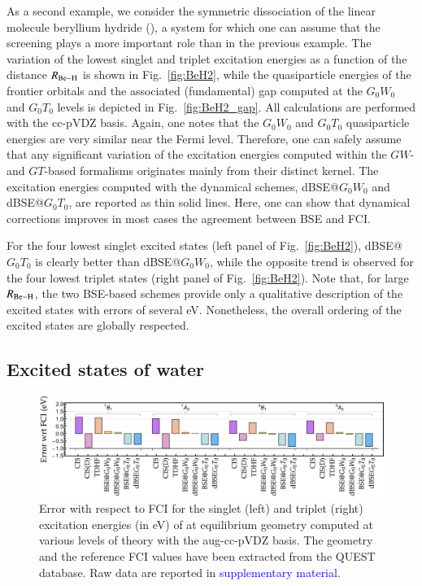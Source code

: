 \documentclass[aip,jcp,reprint,noshowkeys,superscriptaddress]{revtex4-1}
\newcommand{\SupMat}{\textcolor{blue}{supplementary material}}
\begin{document}
As a second example, we consider the symmetric dissociation of the linear molecule beryllium hydride (), a system for which one can assume that the screening plays a more important role than in the previous example.
The variation of the lowest singlet and triplet excitation energies as a function of the distance $R_{\ce{Be-H}}$ is shown in Fig.~\ref{fig:BeH2}, while the quasiparticle energies of the frontier orbitals and the associated (fundamental) gap computed at the $G_0W_0$ and $G_0T_0$ levels is depicted in Fig.~\ref{fig:BeH2_gap}.
All calculations are performed with the cc-pVDZ basis.
Again, one notes that the $G_0W_0$ and $G_0T_0$ quasiparticle energies are very similar near the Fermi level.
Therefore, one can safely assume that any significant variation of the excitation energies computed within the $GW$- and $GT$-based formalisms originates mainly from their distinct kernel.
The excitation energies computed with the dynamical schemes, dBSE@$G_0W_0$ and dBSE@$G_0T_0$, are reported as thin solid lines.
Here, one can show that dynamical corrections improves in most cases the agreement between BSE and FCI.

For the four lowest singlet excited states (left panel of Fig.~\ref{fig:BeH2}), dBSE@$G_0T_0$ is clearly better than dBSE@$G_0W_0$, while the opposite trend is observed for the four lowest triplet states (right panel of Fig.~\ref{fig:BeH2}).
Note that, for large $R_{\ce{Be-H}}$, the two BSE-based schemes provide only a qualitative description of the excited states with errors of several \si{\eV}.
Nonetheless, the overall ordering of the excited states are globally respected.

\subsection{Excited states of water}
\label{sec:H2O}

\begin{figure}
	\includegraphics[width=\linewidth]{fig6}
	\caption{Error with respect to FCI for the singlet (left) and triplet (right) excitation energies (in \si{\eV}) of  at equilibrium geometry computed at various levels of theory with the aug-cc-pVDZ basis.
	The geometry and the reference FCI values have been extracted from the QUEST database. \cite{Veril_2021}
	Raw data are reported in {\SupMat}.}
	\label{fig:H2O}
\end{figure}
\end{document}

